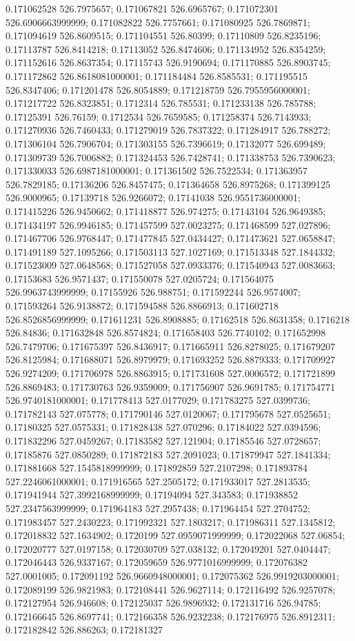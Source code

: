 0.171062528 526.7975657; 0.171067821 526.6965767; 0.171072301 526.6906663999999; 0.171082822 526.7757661; 0.171080925 526.7869871; 0.171094619 526.8609515; 0.171104551 526.80399; 0.17110809 526.8235196; 0.17113787 526.8414218; 0.17113052 526.8474606; 0.171134952 526.8354259; 0.171152616 526.8637354; 0.17115743 526.9190694; 0.171170885 526.8903745; 0.171172862 526.8618081000001; 0.171184484 526.8585531; 0.171195515 526.8347406; 0.171201478 526.8054889; 0.171218759 526.7955956000001; 0.171217722 526.8323851; 0.1712314 526.785531; 0.171233138 526.785788; 0.17125391 526.76159; 0.1712534 526.7659585; 0.171258374 526.7143933; 0.171270936 526.7460433; 0.171279019 526.7837322; 0.171284917 526.788272; 0.171306104 526.7906704; 0.171303155 526.7396619; 0.17132077 526.699489; 0.171309739 526.7006882; 0.171324453 526.7428741; 0.171338753 526.7390623; 0.171330033 526.6987181000001; 0.171361502 526.7522534; 0.171363957 526.7829185; 0.17136206 526.8457475; 0.171364658 526.8975268; 0.171399125 526.9000965; 0.17139718 526.9266072; 0.17141038 526.9551736000001; 0.171415226 526.9450662; 0.171418877 526.974275; 0.17143104 526.9649385; 0.171434197 526.9946185; 0.171457599 527.0023275; 0.171468599 527.027896; 0.171467706 526.9768447; 0.171477845 527.0434427; 0.171473621 527.0658847; 0.171491189 527.1095266; 0.171503113 527.1027169; 0.171513348 527.1844332; 0.171523009 527.0648568; 0.171527058 527.0933376; 0.171540943 527.0083663; 0.17153683 526.9571437; 0.171550078 527.0205724; 0.171564075 526.9963743999999; 0.17155926 526.988751; 0.171592244 526.9574007; 0.171593264 526.9138872; 0.171594588 526.8866913; 0.171602718 526.8526856999999; 0.171611231 526.8908885; 0.17162518 526.8631358; 0.1716218 526.84836; 0.171632848 526.8574824; 0.171658403 526.7740102; 0.171652998 526.7479706; 0.171675397 526.8436917; 0.171665911 526.8278025; 0.171679207 526.8125984; 0.171688071 526.8979979; 0.171693252 526.8879333; 0.171709927 526.9274209; 0.171706978 526.8863915; 0.171731608 527.0006572; 0.171721899 526.8869483; 0.171730763 526.9359009; 0.171756907 526.9691785; 0.171754771 526.9740181000001; 0.171778413 527.0177029; 0.171783275 527.0399736; 0.171782143 527.075778; 0.171790146 527.0120067; 0.171795678 527.0525651; 0.17180325 527.0575331; 0.171828438 527.070296; 0.17184022 527.0394596; 0.171832296 527.0459267; 0.17183582 527.121904; 0.17185546 527.0728657; 0.17185876 527.0850289; 0.171872183 527.2091023; 0.171879947 527.1841334; 0.171881668 527.1545818999999; 0.171892859 527.2107298; 0.171893784 527.2246061000001; 0.171916565 527.2505172; 0.171933017 527.2813535; 0.171941944 527.3992168999999; 0.17194094 527.343583; 0.171938852 527.2347563999999; 0.171964183 527.2957438; 0.171964454 527.2704752; 0.171983457 527.2430223; 0.171992321 527.1803217; 0.171986311 527.1345812; 0.172018832 527.1634902; 0.1720199 527.0959071999999; 0.172022068 527.06854; 0.172020777 527.0197158; 0.172030709 527.038132; 0.172049201 527.0404447; 0.172046443 526.9337167; 0.172059659 526.9771016999999; 0.172076382 527.0001005; 0.172091192 526.9660948000001; 0.172075362 526.9919203000001; 0.172089199 526.9821983; 0.172108441 526.9627114; 0.172116492 526.9257078; 0.172127954 526.946608; 0.172125037 526.9896932; 0.172131716 526.94785; 0.172166645 526.8697741; 0.172166358 526.9232238; 0.172176975 526.8912311; 0.172182842 526.886263; 0.172181327 